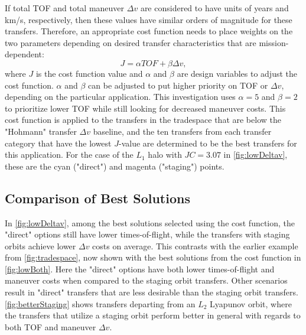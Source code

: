 If total TOF and total maneuver $\Delta v$ are considered to have units of years and km/s,
respectively, then these values have similar orders of magnitude for these transfers. Therefore, an
appropriate cost function needs to place weights on the two parameters depending on desired
transfer characteristics that are mission-dependent:
\begin{equation}
    J=\alpha TOF+\beta\Delta v,
    \label{eq:costfunction}
\end{equation}
where $J$ is the cost function value and $\alpha$ and $\beta$ are design variables to adjust the
cost function. $\alpha$ and $\beta$ can be adjusted to put higher priority on TOF or $\Delta v$,
depending on the particular application. This investigation uses $\alpha=5$ and $\beta=2$ to
prioritize lower TOF while still looking for decreased maneuver costs. This cost function is
applied to the transfers in the tradespace that are below the "Hohmann" transfer $\Delta v$
baseline, and the ten transfers from each transfer category that have the lowest $J$-value are
determined to be the best transfers for this application. For the case of the $L_{1}$ halo with
$JC=3.07$ in \cref{fig:lowDeltav}, these are the cyan ("direct") and magenta ("staging") points.

\subsection{Comparison of Best Solutions}
In \cref{fig:lowDeltav}, among the best solutions selected using the cost function, the "direct"
options still have lower times-of-flight, while the transfers with staging orbits achieve lower
$\Delta v$ costs on average. This contrasts with the earlier example from \cref{fig:tradespace},
now shown with the best solutions from the cost function in \cref{fig:lowBoth}. Here the "direct"
options have both lower times-of-flight and maneuver costs when compared to the staging orbit
transfers. Other scenarios result in "direct" transfers that are less desirable than the staging
orbit transfers. \cref{fig:betterStaging} shows transfers departing from an $L_{2}$ Lyapunov orbit,
where the transfers that utilize a staging orbit perform better in general with regards to both TOF
and maneuver $\Delta v$.

